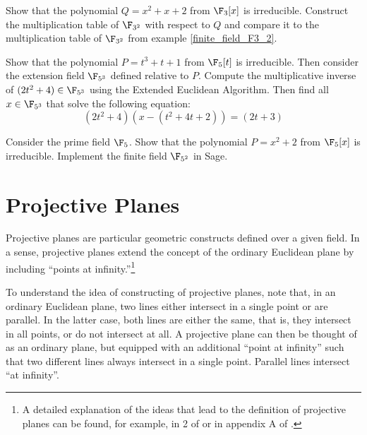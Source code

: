 \begin{exercise} Show that the polynomial $Q=x^2+x+2$ from $\F_3[x]$ is irreducible. Construct the multiplication table of $\F_{3^2}$ with respect to $Q$ and compare it to the multiplication table of $\F_{3^2}$ from example \ref{finite_field_F3_2}.
\end{exercise}

\begin{exercise} Show that the polynomial $P=t^3+t+1$ from $\F_5[t]$ is irreducible. Then consider the extension field $\F_{5^3}$ defined relative to $P$. Compute the multiplicative inverse of $(2t^2+4)\in\F_{5^3}$ using the Extended Euclidean Algorithm. Then find all $x\in\F_{5^3}$ that solve the following equation:
\begin{equation}
(2t^2+4)(x-(t^2+4t+2))= (2t+3)
\end{equation}
\end{exercise}

\begin{exercise}
\label{exercise:finite_fieldF5_2} Consider the prime field $\F_5$. Show that the polynomial $P=x^2+2$ from $\F_5[x]$ is irreducible. Implement the finite field $\F_{5^2}$ in Sage.
\end{exercise}

\begin{comment}
\subsection{Hashing into extension fields} On page \pageref{hashing-prime-fields},\sme{check reference} we have seen how to hash into prime fields. As elements of extension fields can be seen as polynomials over prime fields, hashing into extension fields is therefore possible if every coefficient of the polynomial is hashed independently.
\end{comment}
\section{Projective Planes}\label{sec:planes}
Projective planes are particular geometric constructs defined over a given field. In a sense, projective planes extend the concept of the ordinary Euclidean plane by including ``points at infinity.''\footnote{A detailed explanation of the ideas that lead to the definition of projective planes can be found, for example, in \chaptname{} 2 of \cite{ellis-1992} or in appendix A of \cite{silverman-1994}.}

To understand the idea of constructing of projective planes, note that, in an ordinary Euclidean plane, two lines either intersect in a single point or are parallel. In the latter case, both lines are either the same, that is, they intersect in all points, or do not intersect at all. A projective plane can then be thought of as an ordinary plane, but equipped with an additional ``point at infinity'' such that two different lines always intersect in a single point. Parallel lines intersect ``at infinity''.


